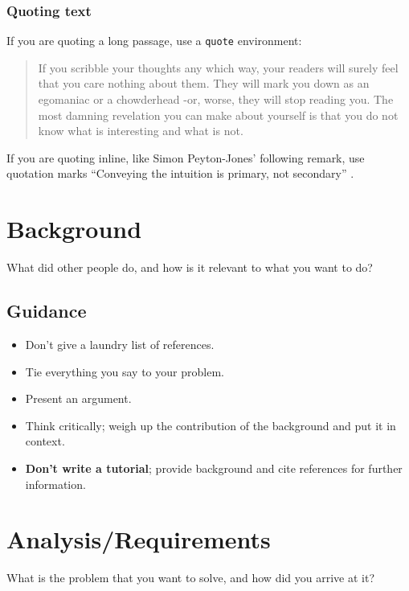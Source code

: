 \documentclass{l4proj}
\begin{document}
\subsection{Quoting text}

If you are quoting a long passage, use a \texttt{quote} environment:

\begin{quote}
     If you scribble your thoughts any which way, your readers will surely feel that you care nothing about them. They will mark you down as an egomaniac or a chowderhead -or, worse, they will stop reading you. The most damning revelation you can make about yourself is that you do not know what is interesting and what is not.
\end{quote} \citep{Von80}

If you are quoting inline, like Simon Peyton-Jones' following remark, use quotation marks ``Conveying the intuition is primary, not
secondary'' \citep{Pey17}.


\chapter{Background}
What did other people do, and how is it relevant to what you want to do?
\section{Guidance}
\begin{itemize}    
    \item
      Don't give a laundry list of references.
    \item
      Tie everything you say to your problem.
    \item
      Present an argument.
    \item Think critically; weigh up the contribution of the background and put it in context.    
    \item
      \textbf{Don't write a tutorial}; provide background and cite
      references for further information.
\end{itemize}

\chapter{Analysis/Requirements}
What is the problem that you want to solve, and how did you arrive at it?
\end{document}

